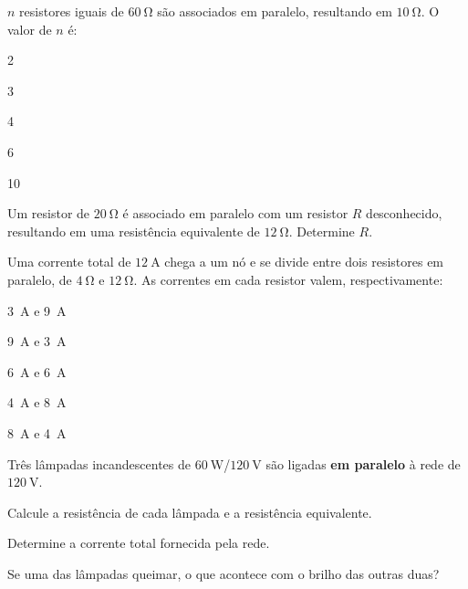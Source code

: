 \begin{questao}[1]{}

$n$ resistores iguais de $\SI{60}{\ohm}$ são associados em paralelo, resultando
em $\SI{10}{\ohm}$. O valor de $n$ é:
\begin{alternativas}[3]
\item 2
\item 3
\item 4
\item 6
\item 10
\end{alternativas}


\end{questao}

\blocoaplicacao
\begin{questao}[2]{}

Um resistor de $\SI{20}{\ohm}$ é associado em paralelo com um resistor $R$
desconhecido, resultando em uma resistência equivalente de $\SI{12}{\ohm}$.
Determine $R$.


\end{questao}
\begin{questao}[2]{}

Uma corrente total de $\SI{12}{\ampere}$ chega a um nó e se divide entre dois
resistores em paralelo, de $\SI{4}{\ohm}$ e $\SI{12}{\ohm}$. As correntes em cada
resistor valem, respectivamente:
\begin{alternativas}[2]
\item \SI{3}{\ampere} e \SI{9}{\ampere}
\item \SI{9}{\ampere} e \SI{3}{\ampere}
\item \SI{6}{\ampere} e \SI{6}{\ampere}
\item \SI{4}{\ampere} e \SI{8}{\ampere}
\item \SI{8}{\ampere} e \SI{4}{\ampere}
\end{alternativas}


\end{questao}
\begin{questao}[2]{}

Três lâmpadas incandescentes de $\SI{60}{\watt}$/$\SI{120}{\volt}$ são ligadas
\textbf{em paralelo} à rede de $\SI{120}{\volt}$.
\begin{itensq}
\item Calcule a resistência de cada lâmpada e a resistência equivalente.
\item Determine a corrente total fornecida pela rede.
\item Se uma das lâmpadas queimar, o que acontece com o brilho das outras duas?
\end{itensq}


\end{questao}
